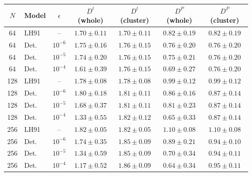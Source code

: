 \begin{tabular}{|c|l|c|c|c|c|c|}
\hline
\rowcolor[HTML]{C0C0C0}
$N$ & Model & $\epsilon$ & $D^{t}$ (whole) & $D^{t}$ (cluster) & $D^{P}$ (whole) & $D^{P}$ (cluster) \\ \hline
64 & LH91 & -- & $1.70\pm0.11$ & $1.70\pm0.11$ & $0.82\pm0.19$ & $0.82\pm0.19$ \\
64 & Det. & $10^{-6}$ & $1.75\pm0.16$ & $1.76\pm0.15$ & $0.76\pm0.20$ & $0.76\pm0.20$ \\
64 & Det. & $10^{-5}$ & $1.74\pm0.20$ & $1.76\pm0.15$ & $0.75\pm0.21$ & $0.76\pm0.20$ \\
64 & Det. & $10^{-4}$ & $1.61\pm0.39$ & $1.76\pm0.15$ & $0.69\pm0.27$ & $0.76\pm0.20$ \\
\hline
128 & LH91 & -- & $1.78\pm0.08$ & $1.78\pm0.08$ & $0.99\pm0.12$ & $0.99\pm0.12$ \\
128 & Det. & $10^{-6}$ & $1.80\pm0.18$ & $1.81\pm0.11$ & $0.86\pm0.16$ & $0.87\pm0.14$ \\
128 & Det. & $10^{-5}$ & $1.68\pm0.37$ & $1.81\pm0.11$ & $0.81\pm0.23$ & $0.87\pm0.14$ \\
128 & Det. & $10^{-4}$ & $1.33\pm0.55$ & $1.82\pm0.12$ & $0.65\pm0.33$ & $0.87\pm0.14$ \\
\hline
256 & LH91 & -- & $1.82\pm0.05$ & $1.82\pm0.05$ & $1.10\pm0.08$ & $1.10\pm0.08$ \\
256 & Det. & $10^{-6}$ & $1.74\pm0.35$ & $1.85\pm0.09$ & $0.89\pm0.21$ & $0.94\pm0.10$ \\
256 & Det. & $10^{-5}$ & $1.34\pm0.59$ & $1.85\pm0.09$ & $0.70\pm0.34$ & $0.94\pm0.11$ \\
256 & Det. & $10^{-4}$ & $1.17\pm0.52$ & $1.86\pm0.09$ & $0.64\pm0.34$ & $0.95\pm0.11$ \\
\hline
\end{tabular}
